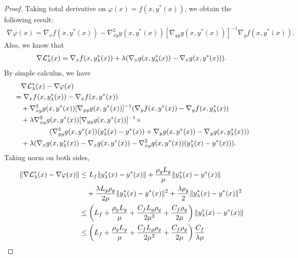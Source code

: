\begin{proof}
Taking total derivative on $\varphi(x) = f(x,y^*(x))$, we obtain the following result:
\begin{align} \label{eq:hyper-grad}
    \nabla \varphi(x) = \nabla_x f(x,y^*(x)) - \nabla_{xy}^2 g(x,y^*(x)) [ \nabla_{yy} g(x,y^*(x))]^{-1} \nabla_y f(x,y^*(x)). 
\end{align}
Also, we know that
\begin{align*}
    \nabla {\mathcal{L}}_{\lambda}^*(x) = \nabla_x f(x,y_{\lambda}^*(x)) + \lambda (\nabla_x g(x,y_{\lambda}^*(x)) - \nabla_x g(x,y^*(x))).
\end{align*}
By simple calculus, we have
\begin{align*}
    &\quad \nabla {\mathcal{L}}_{\lambda}^*(x) - \nabla \varphi(x) \\
    &= \nabla_x f(x,y_{\lambda}^*(x)) - \nabla_x f(x,y^*(x)) \\
    &\quad + \nabla_{xy}^2 g(x,y^*(x)) [ \nabla_{yy} g(x,y^*(x))]^{-1} (\nabla_y f(x,y^*(x)) - \nabla_y f(x,y_{\lambda}^*(x)) \\
    &\quad + \lambda \nabla_{xy}^2 g(x,y^*(x)) [ \nabla_{yy} g(x,y^*(x))]^{-1} \times \\
    &~~~~~~~~~~~~~~~( \nabla_{yy}^2 g(x,y^*(x)) (y_{\lambda}^*(x) - y^*(x)) + \nabla_y g(x,y^*(x)) - \nabla_y g(x,y_{\lambda}^*(x)) ) \\
    &\quad + \lambda ( \nabla_x g(x,y_{\lambda}^*(x)) - \nabla_x  g(x,y^*(x)) - \nabla_{xy}^2 g(x,y^*(x)) (y_{\lambda}^*(x) - y^*(x)) ).
\end{align*}
Taking norm on both sides,
\begin{align*}
    \Vert \nabla {\mathcal{L}}_{\lambda}^*(x) - \nabla \varphi(x) \Vert &\le L_f \Vert y_{\lambda}^*(x) - y^*(x) \Vert + \frac{\rho_g L_g}{\mu} \Vert y_{\lambda}^*(x) - y^*(x) \Vert  \\
    &\quad + \frac{\lambda L_g \rho_g}{2\mu} \Vert y_{\lambda}^*(x) - y^*(x) \Vert^2  + \frac{\lambda \rho_g}{2} \Vert y_{\lambda}^*(x) - y^*(x) \Vert^2 \\
    &\le \left( L_f 
   + \frac{\rho_g L_g}{\mu} + \frac{C_f L_g \rho_g}{2\mu^2} + \frac{C_f \rho_g}{2\mu} 
    \right) \Vert y_{\lambda}^*(x) - y^*(x) \Vert \\
    &\le \left( L_f 
   + \frac{\rho_g L_g}{\mu} + \frac{C_f L_g \rho_g}{2\mu^2} + \frac{C_f \rho_g}{2\mu} 
    \right) \frac{C_f}{\lambda \mu}
\end{align*}


\end{proof}

